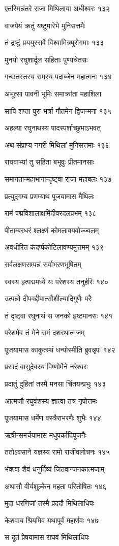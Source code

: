 एतस्मिन्नंतरे राजा मिथिलाया अधीश्वरः १३२

वाजपेयं क्रतुं यष्टुमारेभे मुनिसत्तमैः

तं द्रष्टुं प्रययुस्सर्वे विश्वामित्रपुरोगमाः १३३

मुनयो रघुशार्दूल सहिताः पुण्यचेतसः

गच्छतस्तस्य रामस्य पदाब्जेन महात्मनः १३४

अभूत्सा पावनी भूमिः समाक्रांता महाशिला

सापि शप्ता पुरा भर्त्रा गौतमेन द्विजन्मना १३५

अहल्या रघुनाथस्य पादस्पर्शाच्छुभाऽभवत्

अथ संप्राप्य नगरीं मिथिलां मुनिसत्तमाः १३६

राघवाभ्यां तु सहिता बभूवुः प्रीतमानसाः

समागतान्महाभागान्दृष्ट्वा राजा महाबलः १३७

प्रत्युद्गम्य प्रणम्याथ पूजयामास मैथिलः

रामं पद्मविशालाक्षमिंदीवरदलप्रभम् १३८

पीताम्बरधरं श्लक्ष्णं कोमलावयवोज्ज्वलम्

अवधीरित कंदर्प्पकोटिलावण्यमुत्तमम् १३९

सर्वलक्षणसम्पन्नं सर्वाभरणभूषितम्

स्वस्य हृत्पद्ममध्ये यः परेशस्य तनुर्हरिः १४०

उत्पन्नो दीपवद्दीपात्सौशील्यादिगुणैः परैः

तं दृष्ट्वा रघुनाथं स जनको हृष्टमानसः १४१

परेशमेव तं मेने रामं दशरथात्मजम्

पूजयामास काकुत्स्थं धन्योस्मीति ब्रुवन्नृपः १४२

प्रसादं वासुदेवस्य विष्णोर्मेने नरेश्वरः

प्रदातुं दुहितां तस्मै मनसा चिंतयन्प्रभुः १४३

आत्मजौ रघुवंशस्य ज्ञात्वा तत्र नृपोत्तमः

पूजयामास धर्मेण वस्त्रैराभरणैः शुभैः १४४

ऋषीन्समर्चयामास मधुपर्कादिपूजनैः

ततोऽवसाने यज्ञस्य रामो राजीवलोचनः १४५

भंक्त्वा शैवं धनुर्दिव्यं जितवान्जनकात्मजाम्

अथासौ वीर्यशुल्केन महता परितोषितः १४६

मुदा धरणिजां तस्मै प्रददौ मिथिलाधिपः

केशवाय श्रियमिव यथापूर्वं महार्णवः १४७

स दूतं प्रेषयामास राघवं मिथिलाधिपः

